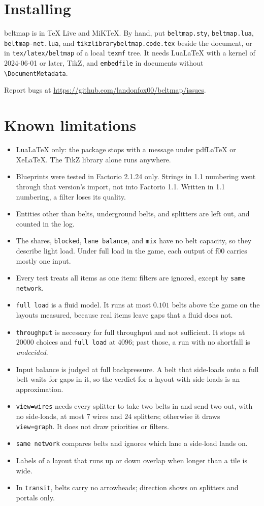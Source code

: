 \documentclass[11pt]{article}
\newcommand\cs[1]{\texttt{\textbackslash#1}}
\newcommand\key[1]{\texttt{#1}}
\begin{document}
	\section{Installing}

	\textsf{beltmap} is in TeX Live and MiK\TeX. By hand, put \texttt{beltmap.sty}, \texttt{beltmap.lua}, \texttt{beltmap-net.lua}, and \texttt{tikzlibrarybeltmap.code.tex} beside the document, or in \texttt{tex/latex/beltmap} of a local \texttt{texmf} tree. It needs Lua\LaTeX{} with a kernel of 2024-06-01 or later, TikZ, and \texttt{embedfile} in documents without \cs{DocumentMetadata}.

	Report bugs at \url{https://github.com/landonfox00/beltmap/issues}.

	\section{Known limitations}

	\begin{itemize}
		\item Lua\LaTeX{} only: the package stops with a message under pdf\LaTeX{} or Xe\LaTeX. The TikZ library alone runs anywhere.
		\item Blueprints were tested in Factorio 2.1.24 only. Strings in 1.1 numbering went through that version's import, not into Factorio 1.1. Written in 1.1 numbering, a filter loses its quality.
		\item Entities other than belts, underground belts, and splitters are left out, and counted in the log.
		\item The shares, \key{blocked}, \key{lane balance}, and \key{mix} have no belt capacity, so they describe light load. Under full load in the game, each output of f00 carries mostly one input.
		\item Every test treats all items as one item: filters are ignored, except by \key{same network}.
		\item \key{full load} is a fluid model. It runs at most $0.101$ belts above the game on the layouts measured, because real items leave gaps that a fluid does not.
		\item \key{throughput} is necessary for full throughput and not sufficient. It stops at $20000$ choices and \key{full load} at $4096$; past those, a run with no shortfall is \emph{undecided}.
		\item Input balance is judged at full backpressure. A belt that side-loads onto a full belt waits for gaps in it, so the verdict for a layout with side-loads is an approximation.
		\item \key{view=wires} needs every splitter to take two belts in and send two out, with no side-loads, at most $7$ wires and $24$ splitters; otherwise it draws \key{view=graph}. It does not draw priorities or filters.
		\item \key{same network} compares belts and ignores which lane a side-load lands on.
		\item Labels of a layout that runs up or down overlap when longer than a tile is wide.
		\item In \key{transit}, belts carry no arrowheads; direction shows on splitters and portals only.
	\end{itemize}
\end{document}
